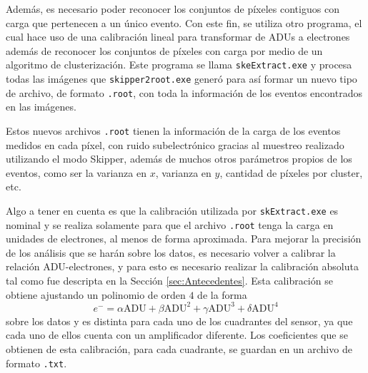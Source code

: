 
Además, es necesario poder reconocer los conjuntos de píxeles contiguos con carga que pertenecen a un único evento. Con este fin, se utiliza otro programa, el cual hace uso de una calibración lineal para transformar de ADUs a electrones además de reconocer los conjuntos de píxeles con carga por medio de un algoritmo de clusterización. Este programa se llama \verb|skeExtract.exe| y procesa todas las imágenes que \verb|skipper2root.exe| generó para así formar un nuevo tipo de archivo, de formato \verb|.root|, con toda la información de los eventos encontrados en las imágenes. 

Estos nuevos archivos \verb|.root| tienen la información de la carga de los eventos medidos en cada píxel, con ruido subelectrónico gracias al muestreo realizado utilizando el modo Skipper, además de muchos otros parámetros propios de los eventos, como ser la varianza en $x$, varianza en $y$, cantidad de píxeles por cluster, etc.

Algo a tener en cuenta es que la calibración utilizada por \verb|skExtract.exe| es nominal y se realiza solamente para que el archivo \verb|.root| tenga la carga en unidades de electrones, al menos de forma aproximada. Para mejorar la precisión de los análisis que se harán sobre los datos, es necesario volver a calibrar la relación ADU-electrones, y para esto es necesario realizar la calibración absoluta tal como fue descripta en la Sección \ref{sec:Antecedentes}. Esta calibración se obtiene ajustando un polinomio de orden $4$ de la forma
\begin{equation*}
    e^{-} 
    = \alpha \mbox{ADU} 
    + \beta \mbox{ADU}^{2}
    + \gamma \mbox{ADU}^{3}
    + \delta \mbox{ADU}^{4}
\end{equation*}
sobre los datos y es distinta para cada uno de los cuadrantes del sensor, ya que cada uno de ellos cuenta con un amplificador diferente. Los coeficientes que se obtienen de esta calibración, para cada cuadrante, se guardan en un archivo de formato \verb|.txt|.

